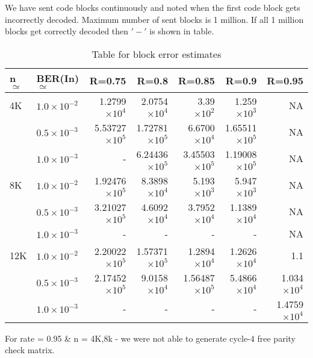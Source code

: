 We have sent code blocks continuously and noted when the first code block gets incorrectly decoded. Maximum number of sent blocks is 1 million. If all 1 million blocks get correctly decoded then $'-'$ is shown in table.
\begin{table}[H]
\centering
\caption[Table for block error estimates of Min Sum decode using random matrix]{ Table for block error estimates  }
\begin{tabular}{|l|l|r|r|r|r|r|}
\hline
n$\simeq$   & BER(In)$\simeq$    & R=0.75  & R=0.8   & R=0.85  & R=0.9 & R=0.95 \\ \hline
4K  & $1.0\times10^{-2}$  &  1.2799$\times10^{4}$   & 2.0754$\times10^{4}$  & 3.39$\times10^{2}$ & 1.259$\times10^{3}$ & NA      
\\ 
    & $0.5\times10^{-3}$  &  5.53727$\times10^{5}$  &  1.72781$\times10^{5}$& 6.6700$\times10^{4}$ & 1.65511$\times10^{5}$ & NA   
\\ 
    & $1.0\times10^{-3}$  & -			      & 6.24436$\times10^{5}$& 3.45503$\times10^{5}$& 1.19008$\times10^{5}$  & NA  
\\ \hline
8K  & $1.0\times10^{-2}$  & 1.92476$\times10^{5}$   & 8.3898$\times10^{4}$  & 5.193$\times10^{3}$ & 5.947$\times10^{3}$         & NA      \\ 
    & $0.5\times10^{-3}$ & 3.21027$\times10^{5}$    & 4.6092$\times10^{4}$& 3.7952$\times10^{4}$ & 1.1389$\times10^{4}$ & NA  
\\ 
    & $1.0\times10^{-3}$ & -				     & -  				 & -         	  & -    & NA             
\\ \hline
12K & $1.0\times10^{-2}$ & 2.20022$\times10^{5}$   & 1.57371$\times10^{5}$  & 1.2894$\times10^{4}$ & 1.2626$\times10^{4}$     & 1.1      \\ 
    & $0.5\times10^{-3}$ & 2.17452$\times10^{5}$   & 9.0158$\times10^{4}$& 1.56487$\times10^{5}$& 5.4866$\times10^{4}$ & 1.034$\times10^{4}$    \\ 
    & $1.0\times10^{-3}$ & -				     & -   & -			  			 & -     & 1.4759$\times10^{4}$   \\ \hline
\end{tabular}
\label{tab:nameForThisTable}
\end{table}
For rate = 0.95 \& n = 4K,8k - we were not able to generate cycle-4 free parity check matrix.




 

